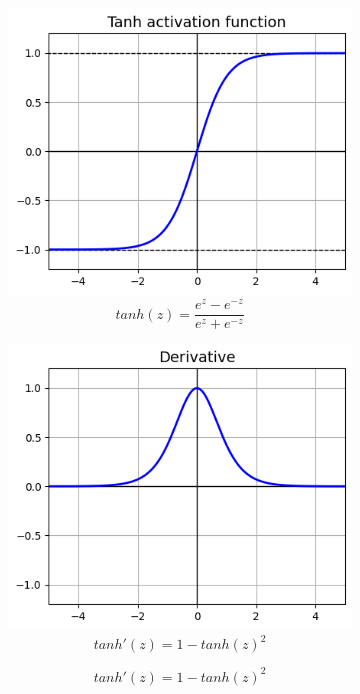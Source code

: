 \begin{figure}[H]
  \centering
  \begin{subfigure}{0.5\textwidth}
      \centering
      \includegraphics[width=0.9\linewidth]{fig/actfunc_tanh.png}
      \caption{%
          \begin{equation}
              tanh(z) = \frac{e^{z} - e^{-z}}{e^{z} + e^{-z}}
          \end{equation}
      }
      \label{fig:actfunc_tanh}
  \end{subfigure}%
  \begin{subfigure}{0.5\textwidth}
      \centering
      \includegraphics[width=0.9\linewidth]{fig/actfunc_tanh_der.png}
      \caption{%
          \begin{equation}
              tanh'(z) = 1 - tanh(z)^{2}
          \end{equation}
      }
      \label{fig:actfunc_tanh_der}
  \end{subfigure}
\end{figure}

